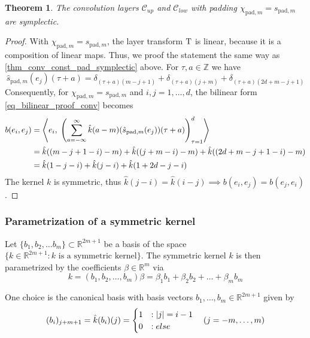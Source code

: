\documentclass[twoside,a4paper]{article}
\newtheorem{theorem}{Theorem}
\begin{document}
\begin{theorem}
	The convolution layers $\mathcal{C}_{up}$ and $\mathcal{C}_{low}$
	with padding $\chi_{\text{pad},m} = s_{\text{pad},m}$ are symplectic.
\end{theorem}
\begin{proof}
	With $\chi_{\text{pad},m} = s_{\text{pad},m}$, the layer transform 
	$\mathrm{T}$ is linear, because it is a composition of linear maps. Thus,
	we proof the statement the same way as \cref{thm_conv_const_pad_symplectic} above.
	For $\tau,a \in \mathbb{Z}$ we have
	\begin{equation*}
		\hat{s}_{\text{pad},m}(e_j)(\tau + a) = 
		\delta_{(\tau + a) (m-j+1)} + \delta_{(\tau + a) (j+m)} + \delta_{(\tau + a) (2d+m-j+1)}
	\end{equation*}
	Consequently, for $\chi_{\text{pad},m} = s_{\text{pad},m}$ and $i,j=1, \dots, d$, 
	the bilinear form \cref{eq_bilinear_proof_conv} becomes
	\begin{align*}
		b(e_i, e_j) &= \left\langle e_i,\; 
			\left( \sum_{a=-\infty}^{\infty} 
				\hat{k}(a-m)
				(\hat{s}_{\text{pad},m}(e_j))(\tau+a)
			\right)_{\tau=1}^d
		 \right\rangle \\
		&= \hat{k}((m-j+1-i)-m) + \hat{k}((j+m-i)-m) + \hat{k}((2d+m-j+1-i)-m) \\
		&= \hat{k}(1-j-i) + \hat{k}(j-i) + \hat{k}(1+2d-j-i)
	\end{align*}
	The kernel $k$ is symmetric, thus $\hat{k}(j-i) = \hat{k}(i-j) \implies b(e_i, e_j) = b(e_j,e_i)$.
\end{proof}

\subsubsection*{Parametrization of a symmetric kernel}

Let $\{b_1, b_2, \dots b_m \} \subset \mathbb{R}^{2m+1}$ be a basis of the space 
$\{ k \in \mathbb{R}^{2m+1} : k \text{ is a symmetric kernel} \}$.
The symmetric kernel $k$ is then parametrized by the coefficients $\beta \in \mathbb{R}^m$ via
\begin{equation*}
	k = (b_1, b_2, \dots, b_m) \beta = \beta_1 b_1 + \beta_2 b_2 + \dots + \beta_m b_m
\end{equation*}

One choice is the canonical basis with basis vectors $b_1, \dots, b_m \in \mathbb{R}^{2m+1}$ given by
\begin{equation*}
	(b_i)_{j+m+1} = \hat{k}(b_i)(j) = \begin{cases}
		1 &: \left|{j}\right| = i-1 \\
		0 &:else
	\end{cases} 
	\quad (j=-m, \dots, m)
\end{equation*}
\end{document}

